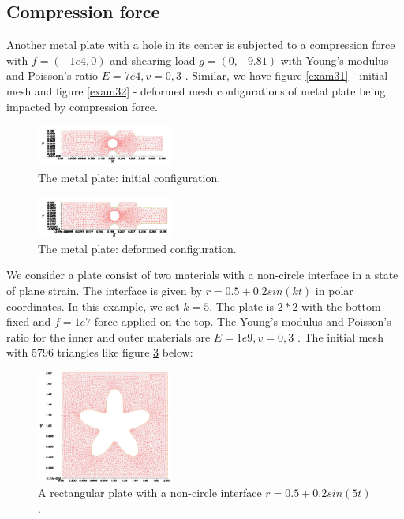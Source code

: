 \documentclass[notitlepage,a4paper,fleqn,9pt]{icmfarticle}
\begin{document}
\begin{multicols}{2}
\subsection{Compression force}
Another metal plate with a hole in its center is subjected to a compression force with $f=(-1e4,0)$ and shearing load $g=(0,-9.81)$ with Young's modulus and Poisson's ratio $E=7e4, v=0,3$ \cite{TIT-07}. Similar, we have figure \eqref{exam31} - initial mesh and figure \eqref{exam32} - deformed mesh configurations of metal plate being impacted by compression force.
\begin{figure}[H]
  \begin{center}
    \includegraphics[width=0.4\textwidth]{4-3-1.pdf}
  \end{center}
  \caption{The metal plate: initial configuration.}
  \label{exam31}
\end{figure}
\begin{figure}[H]
  \begin{center}
    \includegraphics[width=0.4\textwidth]{4-3-2.pdf}
  \end{center}
  \caption{The metal plate: deformed configuration.}
  \label{exam32}
\end{figure}

We consider a plate consist of two materials with a non-circle interface in a state of plane strain. The interface is given by $r = 0.5 + 0.2 sin(kt)$ in polar coordinates. In this example, we set $k=5$. The plate is $2 * 2$ with the bottom fixed and $f = 1e7$ force applied on the top. The Young's modulus and Poisson's ratio for the inner and outer materials are $E=1e9, v=0,3$ \cite{HUI-2011}. The initial mesh with 5796 triangles like figure \ref{exam33} below:

\begin{figure}[H]
  \begin{center}
    \includegraphics[width=0.4\textwidth]{4-3-3.pdf}
  \end{center}
  \caption{A rectangular plate with a non-circle interface $r = 0.5 + 0.2sin(5t)$.}
  \label{exam33}
\end{figure}


\end{multicols}
\end{document}
